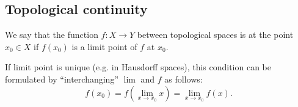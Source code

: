 \subsection{Topological continuity}\label{subsec:topological_continuity}

\begin{definition}\label{def:local_continuity}
  We say that the function \( f: X \to Y \) between topological spaces is  at the point \( x_0 \in X \) if \( f(x_0) \) is a limit point of \( f \) at \( x_0 \).

  If limit point is unique (e.g. in Hausdorff spaces), this condition can be formulated by \enquote{interchanging} \( \lim \) and \( f \) as follows:
  \begin{equation*}
    f(x_0) = f\left( \lim_{x \to x_0} x \right) = \lim_{x \to x_0} f(x).
  \end{equation*}
\end{definition}

